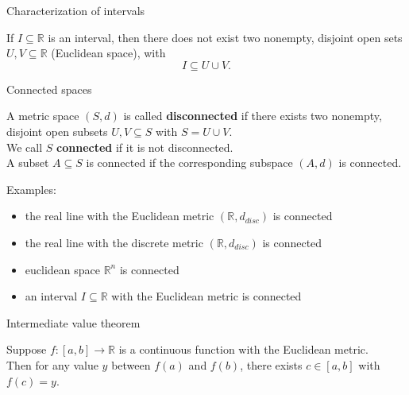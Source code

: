\documentclass{beamer}
\begin{document}
\begin{frame}{Characterization of intervals}
\begin{thm}
If $I\subseteq \mathbb{R}$ is an interval, then there does not exist two nonempty, disjoint open sets $U,V\subseteq\mathbb{R}$ (Euclidean space), with
$$I\subseteq U\cup V.$$
\end{thm}
\end{frame}

\begin{frame}{Connected spaces}
\begin{defn}
A metric space $(S,d)$ is called \textbf{disconnected} if there exists two nonempty, disjoint open subsets $U,V\subseteq S$ with $S=U\cup V$.\\
\pause
We call $S$ \textbf{connected} if it is not disconnected.\\
\pause
A subset $A\subseteq S$ is connected if the corresponding subspace $(A,d)$ is connected.
\end{defn}
\pause
Examples:
\begin{itemize}
\pause
\item the real line with the Euclidean metric $(\mathbb{R},d_{disc})$ is connected
\pause
\item the real line with the discrete metric $(\mathbb{R},d_{disc})$ is connected
\pause
\item euclidean space $\mathbb{R}^n$ is connected
\pause
\item an interval $I\subseteq \mathbb{R}$ with the Euclidean metric is connected
\end{itemize}
\end{frame}

\begin{frame}{Intermediate value theorem}
\begin{thm}
Suppose $f: [a,b]\rightarrow\mathbb{R}$ is a continuous function with the Euclidean metric.\\
Then for any value $y$ between $f(a)$ and $f(b)$, there exists $c\in [a,b]$ with $f(c) =y$.
\end{thm}
\end{frame}
\end{document}
